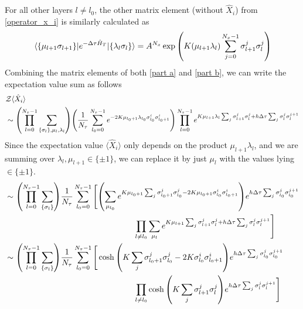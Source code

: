 \documentclass[../thesis_main.tex]{subfiles}
\begin{document}
For all other layers $l \neq l_0$, the other matrix element (without $\hat{X}_i$) from \eqref{operator_x_i} is similarly calculated as 
\begin{equation}
    \mel{\{\mu_{l+1} \sigma _{l+1}\}}{e^{-\Delta \tau \hat{H}_T}}{\{\lambda_{l} \sigma _{l}\}} = A^{N_x}
    \exp\qty(K(\mu_{l + 1} \lambda_{l}) \sum_{j = 0}^{N_x-1} \sigma^j_{l+1} \sigma^j_{l})
    \label{part b}
\end{equation}
Combining the matrix elements of both \eqref{part a} and \eqref{part b}, we can write the expectation value sum as follows
\begin{align}
    & \mathcal{Z} \langle \hat{X}_i \rangle \nonumber \\
    & \sim  \qty(\prod_{l=0}^{N_\tau - 1} \sum_{\{\sigma_l \}, \mu_l, \lambda_l}) \qty(\frac{1}{N_\tau} \sum_{l_0 = 0}^{N_\tau - 1} e^{-2K \mu_{l_0 + 1} \lambda_{l_0} \sigma^{i}_{l_0} \sigma^{i}_{l_0 + 1}}) \prod_{l = 0}^{N_\tau - 1} e^{K \mu_{l+1} \lambda_l \sum_j \sigma^j_{l+1} \sigma ^j_l + h \Delta \tau \sum_j \sigma^j_l \sigma^{j+1}_l} \nonumber 
\end{align}
Since the expectation value $\langle \hat{X}_i \rangle$ only depends on the product $\mu_{l+1}\lambda_l$, and we are summing over $\lambda_l, \mu_{l+1} \in \{\pm 1\}$, we can replace it by just $\mu_l$ with the values lying $\in \{\pm 1\}$.
\begin{align}
    & \sim  \qty(\prod_{l=0}^{N_\tau - 1} \sum_{\{\sigma_l \}}) \frac{1}{N_\tau} \sum_{l_0 = 0}^{N_\tau - 1} \Bigg[\qty(\sum_{\mu_{l_0}} e^{K \mu_{l_0+1} \sum_j \sigma^j_{l_0+1} \sigma^j_{l_0} - 2K \mu_{l_0 + 1}  \sigma^{i}_{l_0} \sigma^{i}_{l_0 + 1}}) e^{ h \Delta \tau  \sum_j \sigma^j_{l_0} \sigma^{j+1}_{l_0}} \nonumber \\
    & \qquad\qquad\qquad\qquad\qquad\qquad\qquad\qquad\prod_{l \neq l_0} \sum_{\mu_{l}} e^{K \mu_{l+1} \sum_j \sigma^j_{l+1} \sigma ^j_l + h \Delta \tau  \sum_j \sigma^j_l \sigma^{j+1}_l} \Bigg] \nonumber \\
    & \sim \qty(\prod_{l=0}^{N_\tau - 1} \sum_{\{\sigma_l \}}) \frac{1}{N_\tau} \sum_{l_0 = 0}^{N_\tau - 1} \Bigg[ \cosh\qty(K \sum_j \sigma^j_{l_0+1} \sigma^j_{l_0} - 2K \sigma^{i}_{l_0} \sigma^{i}_{l_0 + 1}) e^{ h \Delta \tau  \sum_j \sigma^j_{l_0} \sigma^{j+1}_{l_0}} \nonumber \\
    &   \qquad\qquad\qquad\qquad\qquad\qquad\qquad\qquad\prod_{l \neq l_0} \cosh\qty(K \sum_j \sigma^j_{l+1} \sigma ^j_l) e^{h \Delta \tau  \sum_j \sigma^j_l \sigma^{j+1}_l} \Bigg] 
    \label{almostfinal}
\end{align}
\end{document}
